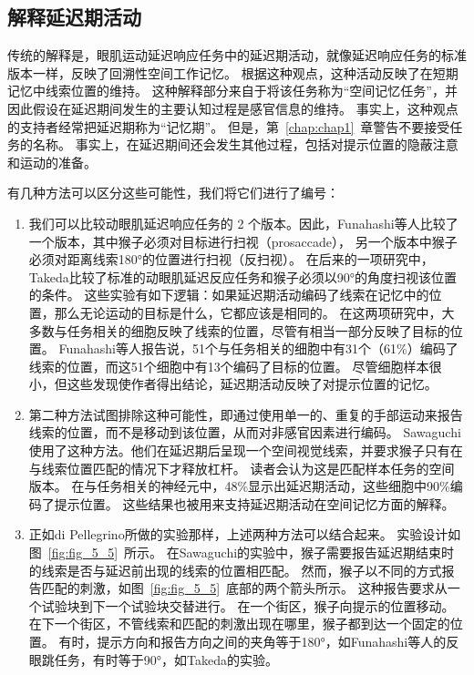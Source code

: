 \subsection{解释延迟期活动}

传统的解释是，眼肌运动延迟响应任务中的延迟期活动，就像延迟响应任务的标准版本一样，反映了回溯性空间工作记忆。
根据这种观点，这种活动反映了在短期记忆中线索位置的维持。
这种解释部分来自于将该任务称为“空间记忆任务”，并因此假设在延迟期间发生的主要认知过程是感官信息的维持。
事实上，这种观点的支持者经常把延迟期称为“记忆期”。
但是，第~\ref{chap:chap1}~章警告不要接受任务的名称。
事实上，在延迟期间还会发生其他过程，包括对提示位置的隐蔽注意和运动的准备。


有几种方法可以区分这些可能性，我们将它们进行了编号：


\begin{enumerate}
	\item 我们可以比较动眼肌延迟响应任务的 2 个版本。因此，Funahashi等人\cite{funahashi1993prefrontal}比较了一个版本，其中猴子必须对目标进行扫视（prosaccade），
	另一个版本中猴子必须对距离线索180°的位置进行扫视（反扫视）。
	在后来的一项研究中，Takeda\cite{takeda2002prefrontal}比较了标准的动眼肌延迟反应任务和猴子必须以90°的角度扫视该位置的条件。
	这些实验有如下逻辑：如果延迟期活动编码了线索在记忆中的位置，那么无论运动的目标是什么，它都应该是相同的。
	在这两项研究中，大多数与任务相关的细胞反映了线索的位置，尽管有相当一部分反映了目标的位置。
	Funahashi等人报告说，51个与任务相关的细胞中有31个（61\%）编码了线索的位置，而这51个细胞中有13个编码了目标的位置。
	尽管细胞样本很小，但这些发现使作者得出结论，延迟期活动反映了对提示位置的记忆。
	\item 第二种方法试图排除这种可能性，即通过使用单一的、重复的手部运动来报告线索的位置，而不是移动到该位置，从而对非感官因素进行编码。
	Sawaguchi\cite{sawaguchi1999properties}使用了这种方法。他们在延迟期后呈现一个空间视觉线索，并要求猴子只有在与线索位置匹配的情况下才释放杠杆。
	读者会认为这是匹配样本任务的空间版本。
	在与任务相关的神经元中，48\%显示出延迟期活动，这些细胞中90\%编码了提示位置。
	这些结果也被用来支持延迟期活动在空间记忆方面的解释。
	\item 正如di Pellegrino\cite{di1993visuospatial}所做的实验那样，上述两种方法可以结合起来。
	实验设计如图~\ref{fig:fig_5_5}~所示。
	在Sawaguchi\cite{sawaguchi1999properties}的实验中，猴子需要报告延迟期结束时的线索是否与延迟前出现的线索的位置相匹配。
	然而，猴子以不同的方式报告匹配的刺激，如图~\ref{fig:fig_5_5}~底部的两个箭头所示。
	这种报告要求从一个试验块到下一个试验块交替进行。
	在一个街区，猴子向提示的位置移动。
	在下一个街区，不管线索和匹配的刺激出现在哪里，猴子都到达一个固定的位置。
	有时，提示方向和报告方向之间的夹角等于180°，如Funahashi等人\cite{funahashi1993prefrontal}的反眼跳任务，有时等于90°，如Takeda\cite{takeda2002prefrontal}的实验。
	

\end{enumerate}
